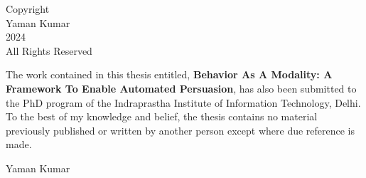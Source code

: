 

\setcounter{page}{2}

\vspace*{\fill}
\begin{center}
    {\large Copyright} \\ %
    \vspace{0.5cm} %
    {\large Yaman Kumar} \\
    \vspace{0.5cm}
    {\large 2024} \\
    \vspace{0.5cm}
    {\large All Rights Reserved}
\end{center}
\vspace*{\fill} %

\newpage

\certificate

\vspace*{0.5in}


\noindent  The work contained in this thesis entitled, \textbf{Behavior As A Modality: A Framework To Enable Automated Persuasion}, has also been submitted to the PhD program of the Indraprastha Institute of Information Technology, Delhi. To the best of my knowledge and belief, the thesis contains no material previously published or written by another person except where due reference is made.

\vspace*{0.5in}

\noindent Yaman Kumar

\vspace*{0.5in}

